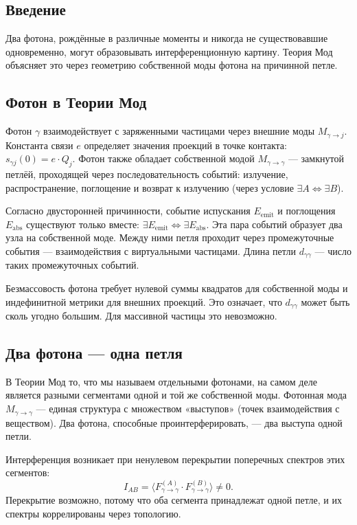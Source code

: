 \documentclass[12pt,a4paper]{article}
\begin{document}
\subsection{Введение}
Два фотона, рождённые в различные моменты и никогда не существовавшие одновременно, могут образовывать интерференционную картину. Теория Мод объясняет это через геометрию собственной моды фотона на причинной петле.

\subsection{Фотон в Теории Мод}
Фотон $\gamma$ взаимодействует с заряженными частицами через внешние моды $M_{\gamma \to j}$. Константа связи $e$ определяет значения проекций в точке контакта: $s_{\gamma j}(0) = e \cdot Q_j$. Фотон также обладает собственной модой $M_{\gamma \to \gamma}$ --- замкнутой петлёй, проходящей через последовательность событий: излучение, распространение, поглощение и возврат к излучению (через условие $\exists A \iff \exists B$).

Согласно двусторонней причинности, событие испускания $E_{\text{emit}}$ и поглощения $E_{\text{abs}}$ существуют только вместе: $\exists E_{\text{emit}} \iff \exists E_{\text{abs}}$. Эта пара событий образует два узла на собственной моде. Между ними петля проходит через промежуточные события --- взаимодействия с виртуальными частицами. Длина петли $d_{\gamma\gamma}$ --- число таких промежуточных событий.

Безмассовость фотона требует нулевой суммы квадратов для собственной моды и индефинитной метрики для внешних проекций. Это означает, что $d_{\gamma\gamma}$ может быть сколь угодно большим. Для массивной частицы это невозможно.

\subsection{Два фотона --- одна петля}
В Теории Мод то, что мы называем отдельными фотонами, на самом деле является разными сегментами одной и той же собственной моды. Фотонная мода $M_{\gamma \to \gamma}$ --- единая структура с множеством «выступов» (точек взаимодействия с веществом). Два фотона, способные проинтерферировать, --- два выступа одной петли.

Интерференция возникает при ненулевом перекрытии поперечных спектров этих сегментов:
\begin{equation}
    I_{AB} = \langle F_{\gamma \to \gamma}^{(A)} \cdot F_{\gamma \to \gamma}^{(B)} \rangle \neq 0.
\end{equation}
Перекрытие возможно, потому что оба сегмента принадлежат одной петле, и их спектры коррелированы через топологию.
\end{document}
